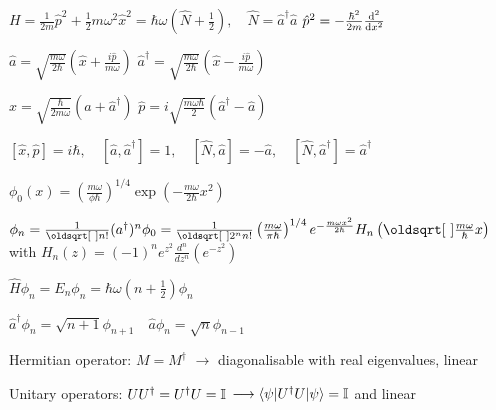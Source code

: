 \begin{squishlist}
    \item$H = \frac{1}{2m}\hat{p}^2 + \frac{1}{2}m \omega^2 \hat{x}^2 = \hbar \omega (\hat{N} + \frac{1}{2}), \quad \hat{N} = \hat{a}^{\dagger} \hat{a}$
    \squishsep $\hat{p}^2 = - \frac{\hbar^2}{2m} \frac{\textrm{d}^2 }{\textrm{d} x^2}$
    \item $\hat{a} = \sqrt{\frac{m\omega}{2\hbar}} \left( \hat{x} + \frac{i \hat{p}}{m \omega}\right)$ \quad 
     $\hat{a}^{\dagger} = \sqrt{\frac{m\omega}{2\hbar}} \left( \hat{x} - \frac{i \hat{p}}{m \omega}\right)$ \quad 
    \item $\hat{x} = \sqrt{\frac{\hbar }{2 m \omega}}(\hat{a} + \hat{a}^{\dagger})$ \quad $\hat{p} = i \sqrt{\frac{m \omega \hbar}{2}} ( \hat{a}^{\dagger} - \hat{a})$
    \item $[\hat{x}, \hat{p}] = i \hbar, \quad [\hat{a}, \hat{a}^{\dagger}] = 1, \quad [\hat{N}, \hat{a}] = - \hat{a}, \quad [\hat{N},\hat{a}^\dagger] = \hat{a}^{\dagger}$
    \item $\phi_0(x) = \left( \frac{m \omega}{\phi \hbar}   \right)^{1/4} \exp \left( - \frac{m \omega }{2 \hbar} x^2\right)$
    \item $ \phi_n = \frac{1}{\sqrt{n!}}(a^{\dagger})^n \phi_0 = \frac{1}{\sqrt{2^n n!}} \left(\frac{m\omega}{\pi \hbar}\right)^{1/4} e^{-\frac{m \omega x^2}{2 \hbar}} H_n \left(\sqrt{\frac{m \omega }{\hbar}}x \right) \\ $ with $H_n(z) = (-1)^n e^{z^2} \frac{d^n}{dz^n} (e^{-z^2})$
    \item $\hat{H} \phi_n = E_n \phi_n = \hbar \omega (n + \frac{1}{2})\phi_n$
    \item $\hat{a}^{\dagger} \phi_n = \sqrt{n+1} \phi_{n+1} \quad \hat{a}\phi_n = \sqrt{n} \phi_{n-1}$
\end{squishlist}


\begin{squishlist}
    \item Hermitian operator: $M = M^{\dagger}$ $\longrightarrow$ diagonalisable with real eigenvalues, linear
    \item Unitary operators: $U U^{\dagger} = U^{\dagger}U = \mathbb{I}$ $\longrightarrow \braket{\psi | U^{\dagger}U|\psi} = \mathbb{I} $ and linear
\end{squishlist}

